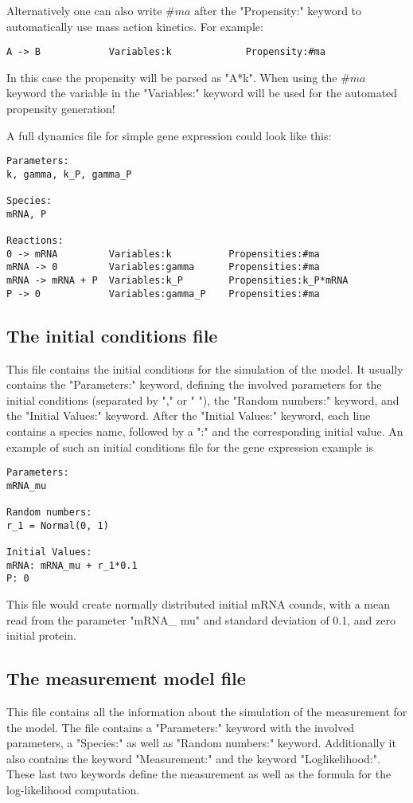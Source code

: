 \documentclass[11pt]{article} %
\begin{document}
\begin{enumerate}
Alternatively one can also write $\#ma$ after the "Propensity:" keyword to automatically use mass action kinetics. For example:
\begin{verbatim}
A -> B	          Variables:k	          Propensity:#ma
\end{verbatim}
In this case the propensity will be parsed as "A*k". When using the $\#ma$ keyword the variable in the "Variables:" keyword will be used for the automated propensity generation!

\end{enumerate}
A full dynamics file for simple gene expression could look like this: 

\begin{verbatim}
Parameters:
k, gamma, k_P, gamma_P

Species:
mRNA, P

Reactions:
0 -> mRNA         Variables:k          Propensities:#ma
mRNA -> 0         Variables:gamma      Propensities:#ma
mRNA -> mRNA + P  Variables:k_P	   	   Propensities:k_P*mRNA
P -> 0            Variables:gamma_P    Propensities:#ma
\end{verbatim}

\subsection{The initial conditions file}
This file contains the initial conditions for the simulation of the model. It usually contains the "Parameters:" keyword, defining the involved parameters for the initial conditions (separated by "," or " "), the "Random numbers:" keyword, and the "Initial Values:" keyword. After the "Initial Values:" keyword, each line contains a species name, followed by a ":" and the corresponding initial value. An example of such an initial conditions file for the gene expression example is

\begin{verbatim}
Parameters:
mRNA_mu

Random numbers:
r_1 = Normal(0, 1)

Initial Values:
mRNA: mRNA_mu + r_1*0.1
P: 0
\end{verbatim}
This file would create normally distributed initial mRNA counds, with a mean read from the parameter "mRNA\_ mu" and standard deviation of 0.1, and zero initial protein. 

\subsection{The measurement model file}
This file contains all the information about the simulation of the measurement for the model. The file contains a "Parameters:" keyword with the involved parameters, a "Species:" as well as "Random numbers:" keyword. Additionally it also contains the keyword "Measurement:" and the keyword "Loglikelihood:". These last two keywords define the measurement as well as the formula for the log-likelihood computation. 
\end{document}
